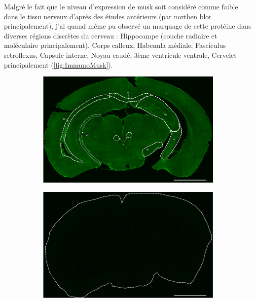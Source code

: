 	Malgré le fait que le niveau d'expression de \gls{musk} soit considéré comme faible dans le tissu nerveux d'après des études antérieurs (par northen blot principalement), j'ai quand même pu observé un marquage de cette protéine dans diverses régions discrètes du cerveau : Hippocampe (couche radiaire et moléculaire principalement), Corps calleux, Habenula médiale, Fasciculus retroflexus, Capsule interne, Noyau caudé, 3ème ventricule ventrale, Cervelet principalement (\cref{fig:ImmunoMusk}). 
	
	\begin{figure}[h] %
		\begin{center}
			\begin{subfigure}[h]{0.99\textwidth}
				\caption{}
				\label{fig:locaMusK}
				\includegraphics[width=\textwidth]{./Images/Immuno/Musk/loca_MuSK.jpg}
			\end{subfigure}
			\begin{subfigure}[h]{0.329\textwidth}
				\caption{}
				\label{fig:locaMusKCtrl}
				\includegraphics[width=\textwidth]{./Images/Immuno/Musk/loca_MuSK_ctrl.jpg}

\end{subfigure}
\end{center}
\end{figure}
